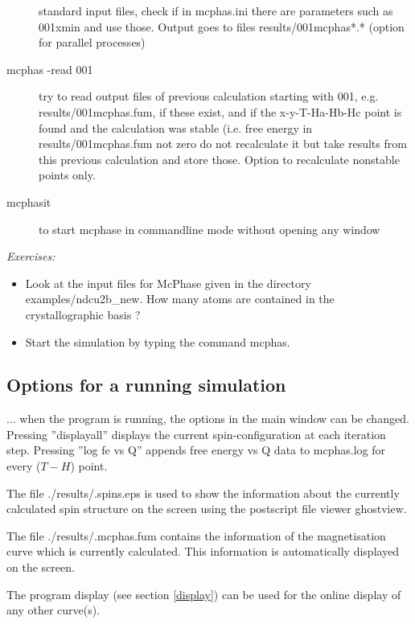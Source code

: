 \begin{description}
 		    standard input files, check if in mcphas.ini there are
                   parameters such as 001xmin and use those. Output goes to files
 		    results/001mcphas*.* (option for parallel processes)
 \item[\prg mcphas\index{mcphas}         -read  001 ]   try to read output files of previous calculation starting
 		     with 001, e.g. results/001mcphas.fum, if these exist, and if 
 		    the x-y-T-Ha-Hb-Hc point is found and the calculation was stable 
                   (i.e. free energy in results/001mcphas.fum not zero do not 
                   recalculate it but take results from this previous calculation
 		     and store those. Option to recalculate nonstable points only.
\item[\prg mcphasit\index{mcphas}] to start mcphase in commandline mode without opening any window
\end{description}

\vspace{1cm}
{\em Exercises:}
\begin{itemize}
\item Look at the input files for {\prg McPhase} given in the directory
{\prg examples/ndcu2b\_new}.  How many atoms are contained in the crystallographic basis ?
\item
Start the simulation by typing the command {\prg mcphas}.
\end{itemize}



\subsection{Options for a running simulation}
... when the program is running, the options in the main window
can be changed. Pressing ''displayall'' displays the current spin-configuration
at each iteration step. Pressing ''log fe vs Q'' appends free energy vs Q
data to {\prg mcphas.log} for every ($T-H$) point.


The file {\prg ./results/.spins.eps} is used to show the information about the currently calculated
spin structure on the screen using the postscript file viewer ghostview.

The file {\prg ./results/.mcphas.fum} contains the information of the magnetisation curve
which is currently calculated. This information is automatically displayed on the screen.


The program {\prg display} (see section \ref{display}) can be used 
for the online display of any other
curve(s).

